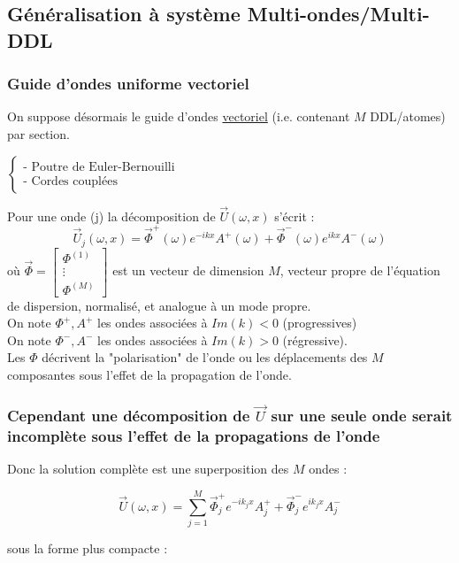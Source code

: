 \documentclass[12pt,a4paper]{article}
\begin{document}
\subsection{Généralisation à système Multi-ondes/Multi-DDL}

\subsubsection{Guide d'ondes uniforme vectoriel}

On suppose désormais le guide d'ondes \underline{vectoriel} (i.e. contenant $M$ DDL/atomes) par section.

\begin{ex}
	$\begin{cases}
		\text{- Poutre de Euler-Bernouilli}\\
		\text{- Cordes couplées}
	\end{cases}$
\end{ex}

Pour une onde (j) la décomposition de $\vec{U}(\omega,x)$ s'écrit :
\[
\vec U_j(\omega,x) = \vec\Phi^+(\omega)e^{-ikx}A^+(\omega) + \vec\Phi^-(\omega)e^{ikx}A^-(\omega)
\]	
où $\vec\Phi = \begin{bmatrix}
	\Phi^{(1)}\\\vdots\\\Phi^{(M)}
\end{bmatrix}$ est un vecteur de dimension $M$, vecteur propre de l'équation de dispersion, normalisé, et analogue à un mode propre.\\
On note $\Phi^+, A^+$ les ondes associées à $Im(k) < 0$ (progressives)\\
On note $\Phi^-, A^-$ les ondes associées à $Im(k) > 0$ (régressive).\\
Les $\Phi$ décrivent la "polarisation" de l'onde ou les déplacements des $M$ composantes sous l'effet de la propagation de l'onde.

\subsubsection{Cependant une décomposition de $\vec U$ sur une seule onde serait incomplète sous l'effet de la propagations de l'onde}

Donc la solution complète est une superposition des $M$ ondes :

\[
\vec U(\omega, x) = \displaystyle\sum_{j=1}^M \vec\Phi_j^+ e^{-ik_j x}A_j^+ + \vec\Phi_j^- e^{ik_j x}A_j^-
\]

sous la forme plus compacte :
\end{document}
